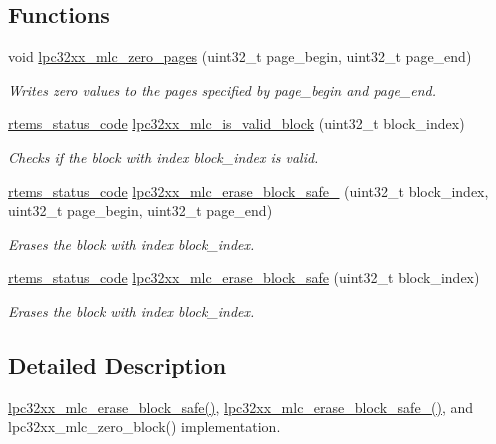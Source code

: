 \subsection*{Functions}
\begin{DoxyCompactItemize}
\item 
void \mbox{\hyperlink{group__lpc32xx__nand__mlc_gae790b87623d06d4795abd696698e9344}{lpc32xx\+\_\+mlc\+\_\+zero\+\_\+pages}} (uint32\+\_\+t page\+\_\+begin, uint32\+\_\+t page\+\_\+end)
\begin{DoxyCompactList}\small\item\em Writes zero values to the pages specified by {\itshape page\+\_\+begin} and {\itshape page\+\_\+end}. \end{DoxyCompactList}\item 
\mbox{\hyperlink{group__ClassicStatus_ga545d41846817eaba6143d52ee4d9e9fe}{rtems\+\_\+status\+\_\+code}} \mbox{\hyperlink{group__lpc32xx__nand__mlc_gad2e1dff4507a4ba350d817a1493cad5f}{lpc32xx\+\_\+mlc\+\_\+is\+\_\+valid\+\_\+block}} (uint32\+\_\+t block\+\_\+index)
\begin{DoxyCompactList}\small\item\em Checks if the block with index {\itshape block\+\_\+index} is valid. \end{DoxyCompactList}\item 
\mbox{\hyperlink{group__ClassicStatus_ga545d41846817eaba6143d52ee4d9e9fe}{rtems\+\_\+status\+\_\+code}} \mbox{\hyperlink{group__lpc32xx__nand__mlc_gab7abd0702699aa8db9c2acb4eb55258c}{lpc32xx\+\_\+mlc\+\_\+erase\+\_\+block\+\_\+safe\+\_}} (uint32\+\_\+t block\+\_\+index, uint32\+\_\+t page\+\_\+begin, uint32\+\_\+t page\+\_\+end)
\begin{DoxyCompactList}\small\item\em Erases the block with index {\itshape block\+\_\+index}. \end{DoxyCompactList}\item 
\mbox{\hyperlink{group__ClassicStatus_ga545d41846817eaba6143d52ee4d9e9fe}{rtems\+\_\+status\+\_\+code}} \mbox{\hyperlink{group__lpc32xx__nand__mlc_gab3b2378535527c368dd10f78a4eca68c}{lpc32xx\+\_\+mlc\+\_\+erase\+\_\+block\+\_\+safe}} (uint32\+\_\+t block\+\_\+index)
\begin{DoxyCompactList}\small\item\em Erases the block with index {\itshape block\+\_\+index}. \end{DoxyCompactList}\end{DoxyCompactItemize}


\subsection{Detailed Description}
\mbox{\hyperlink{group__lpc32xx__nand__mlc_gab3b2378535527c368dd10f78a4eca68c}{lpc32xx\+\_\+mlc\+\_\+erase\+\_\+block\+\_\+safe()}}, \mbox{\hyperlink{group__lpc32xx__nand__mlc_gab7abd0702699aa8db9c2acb4eb55258c}{lpc32xx\+\_\+mlc\+\_\+erase\+\_\+block\+\_\+safe\+\_()}}, and lpc32xx\+\_\+mlc\+\_\+zero\+\_\+block() implementation. 

